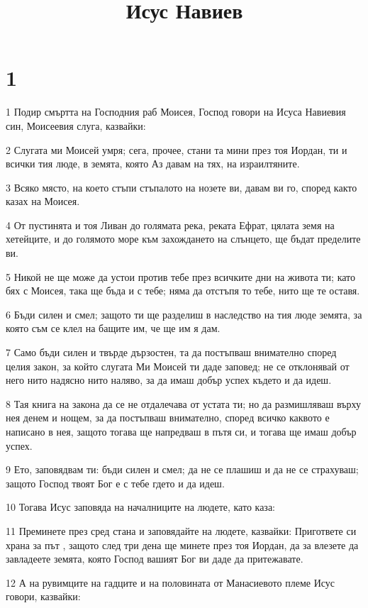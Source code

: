 

\title{Исус Навиев}


\chapter{1}

\par 1 Подир смъртта на Господния раб Моисея, Господ говори на Исуса Навиевия син, Моисеевия слуга, казвайки:
\par 2 Слугата ми Моисей умря; сега, прочее, стани та мини през тоя Иордан, ти и всички тия люде, в земята, която Аз давам на тях, на израилтяните.
\par 3 Всяко място, на което стъпи стъпалото на нозете ви, давам ви го, според както казах на Моисея.
\par 4 От пустинята и тоя Ливан до голямата река, реката Ефрат, цялата земя на хетейците, и до голямото море към захождането на слънцето, ще бъдат пределите ви.
\par 5 Никой не ще може да устои против тебе през всичките дни на живота ти; като бях с Моисея, така ще бъда и с тебе; няма да отстъпя то тебе, нито ще те оставя.
\par 6 Бъди силен и смел; защото ти ще разделиш в наследство на тия люде земята, за която съм се клел на бащите им, че ще им я дам.
\par 7 Само бъди силен и твърде дързостен, та да постъпваш внимателно според целия закон, за който слугата Ми Моисей ти даде заповед; не се отклонявай от него нито надясно нито наляво, за да имаш добър успех където и да идеш.
\par 8 Тая книга на закона да се не отдалечава от устата ти; но да размишляваш върху нея денем и нощем, за да постъпваш внимателно, според всичко каквото е написано в нея, защото тогава ще напредваш в пътя си, и тогава ще имаш добър успех.
\par 9 Ето, заповядвам ти: бъди силен и смел; да не се плашиш и да не се страхуваш; защото Господ твоят Бог е с тебе гдето и да идеш.
\par 10 Тогава Исус заповяда на началниците на людете, като каза:
\par 11 Преминете през сред стана и заповядайте на людете, казвайки: Пригответе си храна за път , защото след три дена ще минете през тоя Иордан, да за влезете да завладеете земята, която Господ вашият Бог ви даде да притежавате.
\par 12 А на рувимците на гадците и на половината от Манасиевото племе Исус говори, казвайки:
